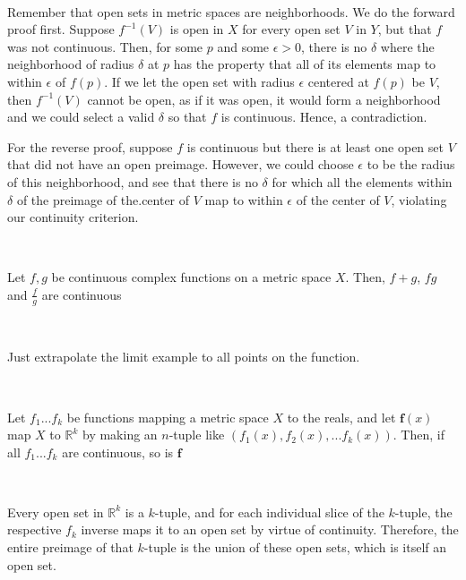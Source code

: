 \documentclass{article}
\begin{document}
\begin{customproof}
\

Remember that open sets in metric spaces are neighborhoods. We do the forward proof first. Suppose $f^{-1} (V)$ is open in $X$ for every open set $V$ in $Y$, but that $f$ was not continuous. Then, for some $p$ and some $\epsilon > 0$, there is no $\delta$ where the neighborhood of radius $\delta$ at $p$ has the property that all of its elements map to within $\epsilon$ of $f(p)$. If we let the open set with radius $\epsilon$ centered at $f(p)$ be $V$, then $f ^{-1} (V)$ cannot be open, as if it was open, it would form a neighborhood and we could select a valid $\delta$ so that $f$ is continuous. Hence, a contradiction.

For the reverse proof, suppose $f$ is continuous but there is at least one open set $V$ that did not have an open preimage. However, we could choose $\epsilon$ to be the radius of this neighborhood, and see that there is no $\delta$ for which all the elements within $\delta$ of the preimage of the.center of $V$ map to within $\epsilon$ of the center of $V$, violating our continuity criterion.
\end{customproof}

\begin{theorem}
\

Let $f,g$ be continuous complex functions on a metric space $X$. Then, $f+g$, $fg$ and $\frac{f}{g}$ are continuous
\end{theorem}

\begin{customproof}
\

Just extrapolate the limit example to all points on the function.
\end{customproof}

\begin{theorem}
\

Let $f_1 ... f_k$ be functions mapping a metric space $X$ to the reals, and let $\mathbf{f}(x)$ map $X$ to $\mathbb{R}^k$ by making an $n$-tuple like $(f_1(x), f_2(x), ... f_k(x))$. Then, if all $f_1 ... f_k$ are continuous, so is $\mathbf{f}$
\end{theorem}

\begin{customproof}
\

Every open set in $\mathbb{R}^k$ is a $k$-tuple, and for each individual slice of the $k$-tuple, the respective $f_k$ inverse maps it to an open set by virtue of continuity. Therefore, the entire preimage of that $k$-tuple is the union of these open sets, which is itself an open set.
\end{customproof}
\end{document}
